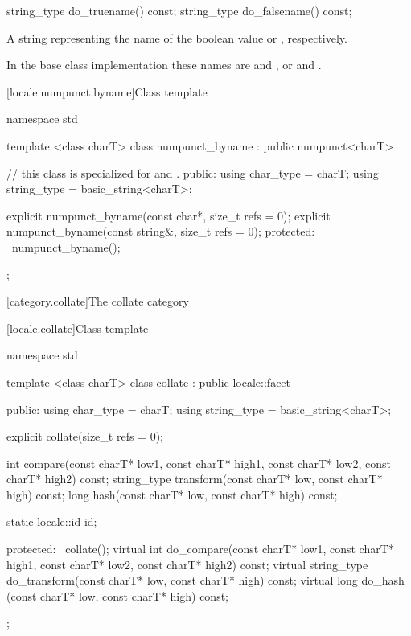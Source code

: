 %
%
\begin{itemdecl}
string_type do_truename()  const;
string_type do_falsename() const;
\end{itemdecl}

\begin{itemdescr}
\pnum
\returns
A string representing the name of the boolean value
or
,
respectively.

\pnum
In the base class implementation these names are
 and , or  and .
\end{itemdescr}

[locale.numpunct.byname]{Class template }

%
\begin{codeblock}
namespace std {
  template <class charT>
  class numpunct_byname : public numpunct<charT> {
  // this class is specialized for  and .
  public:
    using char_type   = charT;
    using string_type = basic_string<charT>;

    explicit numpunct_byname(const char*, size_t refs = 0);
    explicit numpunct_byname(const string&, size_t refs = 0);
  protected:
   ~numpunct_byname();
  };
}
\end{codeblock}

[category.collate]{The collate category}

[locale.collate]{Class template }

%
\begin{codeblock}
namespace std {
  template <class charT>
  class collate : public locale::facet {
  public:
    using char_type   = charT;
    using string_type = basic_string<charT>;

    explicit collate(size_t refs = 0);

    int compare(const charT* low1, const charT* high1,
                const charT* low2, const charT* high2) const;
    string_type transform(const charT* low, const charT* high) const;
    long hash(const charT* low, const charT* high) const;

    static locale::id id;

  protected:
    ~collate();
    virtual int do_compare(const charT* low1, const charT* high1,
                           const charT* low2, const charT* high2) const;
    virtual string_type do_transform(const charT* low, const charT* high) const;
    virtual long do_hash (const charT* low, const charT* high) const;
  };
}
\end{codeblock}

